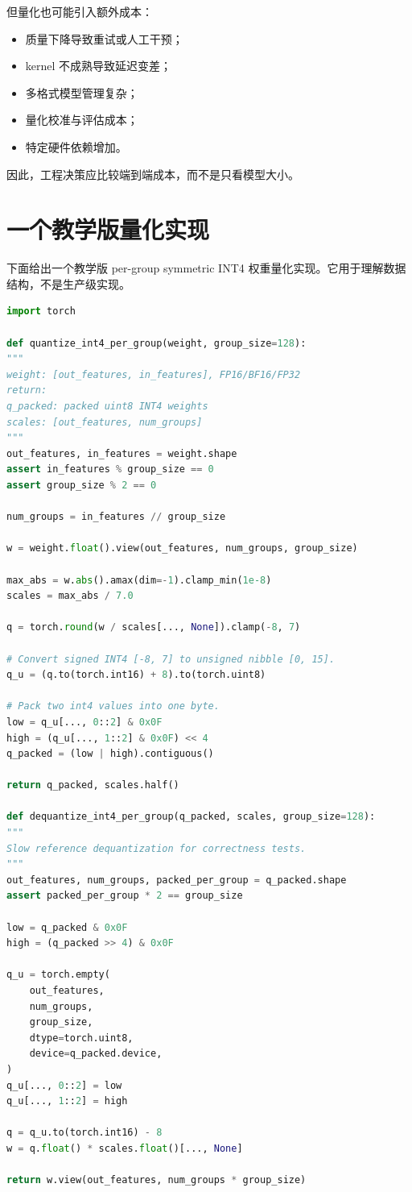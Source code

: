 但量化也可能引入额外成本：

\begin{itemize}
\item 质量下降导致重试或人工干预；
\item kernel 不成熟导致延迟变差；
\item 多格式模型管理复杂；
\item 量化校准与评估成本；
\item 特定硬件依赖增加。
\end{itemize}

因此，工程决策应比较端到端成本，而不是只看模型大小。

\section{一个教学版量化实现}
\label{sec:toy-quantization-implementation}

下面给出一个教学版 per-group symmetric INT4 权重量化实现。它用于理解数据结构，不是生产级实现。

\begin{lstlisting}[language=Python,caption={Per-group symmetric INT4 权重量化示意},label={lst:per-group-int4-quantization}]
import torch

def quantize_int4_per_group(weight, group_size=128):
"""
weight: [out_features, in_features], FP16/BF16/FP32
return:
q_packed: packed uint8 INT4 weights
scales: [out_features, num_groups]
"""
out_features, in_features = weight.shape
assert in_features % group_size == 0
assert group_size % 2 == 0

num_groups = in_features // group_size

w = weight.float().view(out_features, num_groups, group_size)

max_abs = w.abs().amax(dim=-1).clamp_min(1e-8)
scales = max_abs / 7.0

q = torch.round(w / scales[..., None]).clamp(-8, 7)

# Convert signed INT4 [-8, 7] to unsigned nibble [0, 15].
q_u = (q.to(torch.int16) + 8).to(torch.uint8)

# Pack two int4 values into one byte.
low = q_u[..., 0::2] & 0x0F
high = (q_u[..., 1::2] & 0x0F) << 4
q_packed = (low | high).contiguous()

return q_packed, scales.half()

def dequantize_int4_per_group(q_packed, scales, group_size=128):
"""
Slow reference dequantization for correctness tests.
"""
out_features, num_groups, packed_per_group = q_packed.shape
assert packed_per_group * 2 == group_size

low = q_packed & 0x0F
high = (q_packed >> 4) & 0x0F

q_u = torch.empty(
    out_features,
    num_groups,
    group_size,
    dtype=torch.uint8,
    device=q_packed.device,
)
q_u[..., 0::2] = low
q_u[..., 1::2] = high

q = q_u.to(torch.int16) - 8
w = q.float() * scales.float()[..., None]

return w.view(out_features, num_groups * group_size)

\end{lstlisting}


